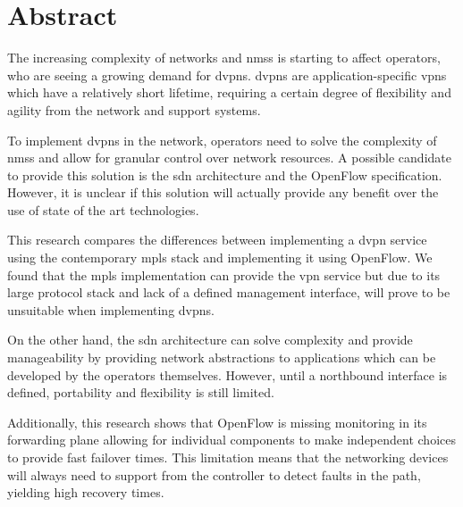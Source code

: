 \vspace*{\fill}
{\section*{Abstract}
\label{sec:summary}

The increasing complexity of networks and \acsp{nms} is starting to affect operators, who are seeing a growing demand for \aclp{dvpn}. \acsp{dvpn} are application-specific \acsp{vpn} which have a relatively short lifetime, requiring a certain degree of flexibility and agility from the network and support systems.

To implement \acsp{dvpn} in the network, operators need to solve the complexity of \acsp{nms} and allow for granular control over network resources. A possible candidate to provide this solution is the \acs{sdn} architecture and the OpenFlow specification. However, it is unclear if this solution will actually provide any benefit over the use of state of the art technologies.

This research compares the differences between implementing a \acs{dvpn} service using the contemporary \acs{mpls} stack and implementing it using OpenFlow. 
We found that the \acs{mpls} implementation can provide the \acs{vpn} service but due to its large protocol stack and lack of a defined management interface, will prove to be unsuitable when implementing \acsp{dvpn}. 

On the other hand, the \acs{sdn} architecture can solve complexity and provide manageability by providing network abstractions to applications which can be developed by the operators themselves. However, until a northbound interface is defined, portability and flexibility is still limited. 

Additionally, this research shows that OpenFlow is missing monitoring in its forwarding plane allowing for individual components to make independent choices to provide fast failover times. This limitation means that the networking devices will always need to support from the controller to detect faults in the path, yielding high recovery times.




}
\vspace*{\fill}
